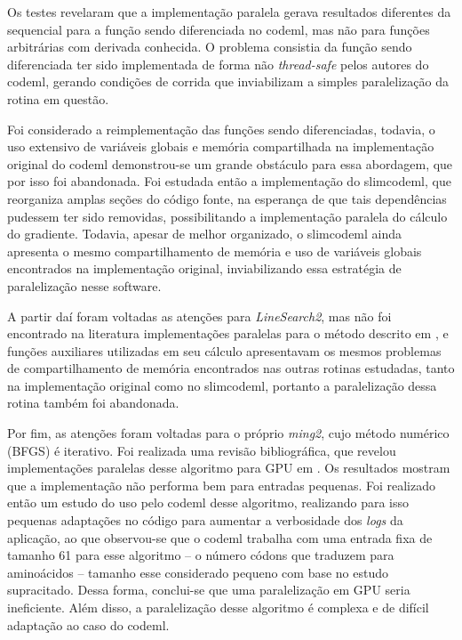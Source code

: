 \documentclass[cic,tc]{iiufrgs}
\begin{document}
{Os testes revelaram que a implementação paralela gerava resultados diferentes
da sequencial para a função sendo diferenciada no codeml, mas não para funções
arbitrárias com derivada conhecida. O problema consistia da função sendo
diferenciada ter sido implementada de forma não \textit{thread-safe} pelos
autores do codeml, gerando condições de corrida que inviabilizam a simples
paralelização da rotina em questão.

Foi considerado a reimplementação das funções sendo diferenciadas, todavia, o
uso extensivo de variáveis globais e memória compartilhada na implementação
original do codeml demonstrou-se um grande obstáculo para essa abordagem, que
por isso foi abandonada. Foi estudada então a implementação do slimcodeml, que
reorganiza amplas seções do código fonte, na esperança de que tais
dependências pudessem ter sido removidas, possibilitando a implementação
paralela do cálculo do gradiente. Todavia, apesar de melhor organizado, o
slimcodeml ainda apresenta o mesmo compartilhamento de memória e uso de
variáveis globais encontrados na implementação original, inviabilizando essa
estratégia de paralelização nesse software.

A partir daí foram voltadas as atenções para \textit{LineSearch2}, mas não foi
encontrado na literatura implementações paralelas para o método descrito em
\cite{wolfe1978numerical}, e funções auxiliares utilizadas em seu cálculo
apresentavam os mesmos problemas de compartilhamento de memória encontrados nas
outras rotinas estudadas, tanto na implementação original como no slimcodeml,
portanto a paralelização dessa rotina também foi abandonada.

Por fim, as atenções foram voltadas para o próprio \textit{ming2}, cujo método
numérico (BFGS) é iterativo. Foi realizada uma revisão bibliográfica, que
revelou implementações paralelas desse algoritmo para GPU em
\cite{fei2014parallel}. Os resultados mostram que a implementação não
performa bem para entradas pequenas. Foi realizado então um estudo do uso pelo
codeml desse algoritmo, realizando para isso pequenas adaptações no código para
aumentar a verbosidade dos \textit{logs} da aplicação, ao que observou-se  que
o codeml trabalha com uma entrada fixa de tamanho 61 para esse algoritmo -- o
número códons que traduzem para aminoácidos -- tamanho esse considerado pequeno
com base no estudo supracitado. Dessa forma, conclui-se que uma paralelização
em GPU seria ineficiente. Além disso, a paralelização desse algoritmo é
complexa e de difícil adaptação ao caso do codeml.

}
\end{document}
